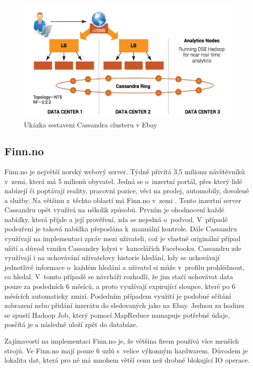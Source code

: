 \begin{figure}[h]
\centering
\includegraphics[scale=0.4]{images/ebay}
\caption{Ukázka sestaveni Cassandra clusteru v Ebay \cite{ebay}}
\label{fig:timeseries1}
\end{figure}

\subsection{Finn.no}
Finn.no je největší norský webový server. Týdně přivítá 3,5 milionu návštěvníků v~zemi, která má 5 milionů obyvatel. Jedná se o~inzertní portál, přes který lidé nabízejí či poptávají reality, pracovní pozice, věci na prodej, automobily, dovolené a služby. Na většinu z~těchto oblastí má Finn.no v~zemi . Tento inzertní server Cassandru opět využívá na několik způsobů. Prvním je ohodnocení každé nabídky, která přijde a její prověření, zda se nejedná o~podvod. V~případě podezření je taková nabídka přeposlána k~manuální kontrole. Dále Cassandru využívají na implementaci zpráv mezi uživateli, což je vlastně originální případ užití a důvod vzniku Cassandry kdysi v~kancelářích Facebooku. Cassandru zde využívají i na uchovávání uživatelovy historie hledání, kdy se uchovávají jednotlivé informace o~každém hledání a uživatel si může v~profilu prohlédnout, co hledal. V~tomto případě se návrháři rozhodli, že jim stačí uchovávat data pouze za posledních 6 měsíců, a proto využívají expirující sloupce, které po 6 měsících automaticky zmizí. Posledním případem využití je podobné sčítání zobrazení nebo přidání inzerátu do sledovaných jako na Ebay. Jednou za hodinu se spustí Hadoop Job, který pomocí MapReduce namapuje potřebné údaje, posčítá je a následně uloží zpět do databáze.

Zajímavostí na implementaci Finn.no je, že většina firem používá více menších strojů. Ve Finn.no mají pouze 6 uzlů s~velice výkonným hardwarem. Důvodem je lokalita dat, která pro ně má mnohem větší cenu než drobné blokující IO operace. 

